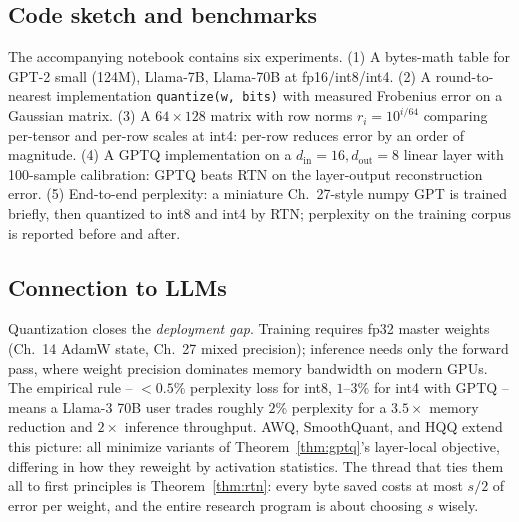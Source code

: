 \subsection*{Code sketch and benchmarks}

The accompanying notebook contains six experiments. (1) A bytes-math table for GPT-2 small (124M), Llama-7B, Llama-70B at fp16/int8/int4. (2) A round-to-nearest implementation \verb|quantize(w, bits)| with measured Frobenius error on a Gaussian matrix. (3) A $64\times 128$ matrix with row norms $r_i = 10^{i/64}$ comparing per-tensor and per-row scales at int4: per-row reduces error by an order of magnitude. (4) A GPTQ implementation on a $d_{\mathrm{in}}=16, d_{\mathrm{out}}=8$ linear layer with 100-sample calibration: GPTQ beats RTN on the layer-output reconstruction error. (5) End-to-end perplexity: a miniature Ch.~27-style numpy GPT is trained briefly, then quantized to int8 and int4 by RTN; perplexity on the training corpus is reported before and after.

\subsection*{Connection to LLMs}

Quantization closes the \emph{deployment gap}. Training requires fp32 master weights (Ch.~14 AdamW state, Ch.~27 mixed precision); inference needs only the forward pass, where weight precision dominates memory bandwidth on modern GPUs. The empirical rule -- $<0.5\%$ perplexity loss for int8, $1$--$3\%$ for int4 with GPTQ -- means a Llama-3 70B user trades roughly $2\%$ perplexity for a $3.5\times$ memory reduction and $2\times$ inference throughput. AWQ, SmoothQuant, and HQQ extend this picture: all minimize variants of Theorem~\ref{thm:gptq}'s layer-local objective, differing in how they reweight by activation statistics. The thread that ties them all to first principles is Theorem~\ref{thm:rtn}: every byte saved costs at most $s/2$ of error per weight, and the entire research program is about choosing $s$ wisely.
